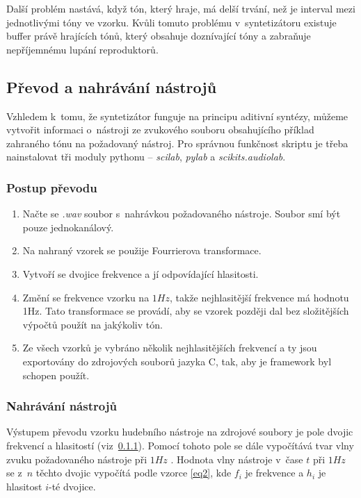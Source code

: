 Další problém nastává, když tón, který hraje, má delší trvání, než je interval mezi jednotlivými tóny ve vzorku.
Kvůli tomuto problému v~syntetizátoru existuje buffer právě hrajících tónů, který obsahuje doznívající tóny a zabraňuje nepříjemnému lupání reproduktorů.

\subsection{Převod a nahrávání nástrojů} \label{scriptInstruments}
Vzhledem k~tomu, že syntetizátor funguje na principu aditivní syntézy, můžeme vytvořit informaci o~nástroji ze zvukového souboru obsahujícího příklad zahraného tónu na požadovaný nástroj.
Pro správnou funkčnost skriptu je třeba nainstalovat tři moduly pythonu -- \emph{scilab}, \emph{pylab} a \emph{scikits.audiolab}.

\subsubsection{Postup převodu} \label{prevodInstruments}
\begin{enumerate}
  \item Načte se \emph{.wav} soubor s~nahrávkou požadovaného nástroje. Soubor smí být pouze jednokanálový.
  \item Na nahraný vzorek se použije Fourrierova transformace.
  \item Vytvoří se dvojice frekvence a jí odpovídající hlasitosti.
  \item Změní se frekvence vzorku na $1Hz$, takže nejhlasitější frekvence má hodnotu 1Hz. Tato transformace se provádí, aby se vzorek později dal bez složitějších výpočtů použít na jakýkoliv tón.
  \item Ze všech vzorků je vybráno několik nejhlasitějších frekvencí a ty jsou exportovány do zdrojových souborů jazyka C, tak, aby je framework byl schopen použít.
\end{enumerate}

\subsubsection{Nahrávání nástrojů}
Výstupem převodu vzorku hudebního nástroje na zdrojové soubory je pole dvojic frekvencí a hlasitostí (viz~\ref{prevodInstruments}).
Pomocí tohoto pole se dále vypočítává tvar vlny zvuku požadovaného nástroje při $1Hz$ .
Hodnota vlny nástroje v~čase $t$ při $1Hz$ se z~$n$ těchto dvojic vypočítá podle vzorce \ref{eq2}, kde $f_{i}$ je frekvence a $h_{i}$ je hlasitost $i$-té dvojice.

